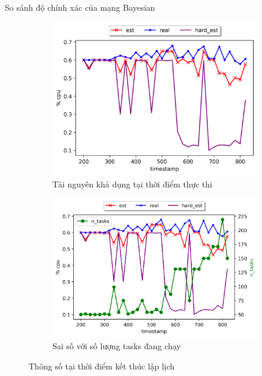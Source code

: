 \documentclass[11pt,xcolor={dvipsnames}, aspectratio=169]{beamer}
\begin{document}
\begin{frame}
{So sánh độ chính xác của mạng Bayesian}
\begin{figure}
\centering
\begin{subfigure}{.5\textwidth}
  \centering
  \includegraphics[width=.85\linewidth]{images/cpu_usage_estimation_1.png}
  \caption{Tài nguyên khả dụng tại thời điểm thực thi}
  \label{fig:usage_est_a}
\end{subfigure}%
\begin{subfigure}{.5\textwidth}
  \centering
  \includegraphics[width=.9\linewidth]{images/cpu_usage_estimation_2.png}
  \caption{Sai số với số lượng tasks đang chạy}
   \label{fig:usage_est_b}
\end{subfigure}
\caption{Thông số tại thời điểm kết thúc lập lịch}
\label{fig:usage_est}
\end{figure}
\end{frame}
\end{document}
